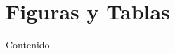 \documentclass{beamer}
\begin{document}
\section{Figuras y Tablas}

\begin{frame}{Contenido}
  \begin{multicols}{2}
    \tableofcontents[currentsection]
  \end{multicols}
\end{frame}

\end{document}
